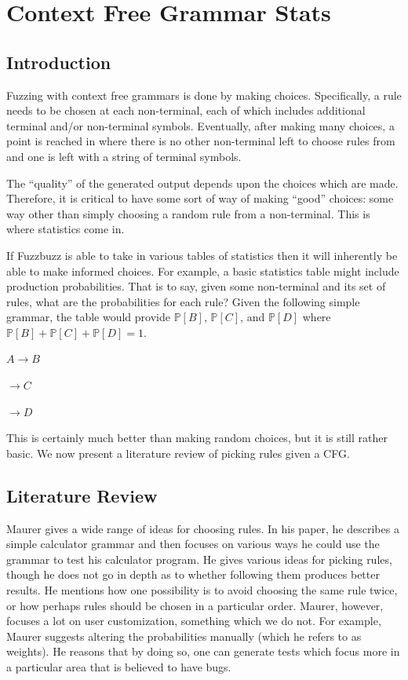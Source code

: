 \section{Context Free Grammar Stats}
\subsection{Introduction}
Fuzzing with context free grammars is done by making choices. Specifically, a
rule needs to be chosen at each non-terminal, each of which includes additional
terminal and/or non-terminal symbols. Eventually, after making many choices, a
point is reached in where there is no other non-terminal left to choose rules
from and one is left with a string of terminal symbols.

The ``quality'' of the generated output depends upon the choices
which are made. Therefore, it is critical to have some sort of way of making
``good'' choices: some way other than simply choosing a random rule from a
non-terminal. This is where statistics come in.

If Fuzzbuzz is able to take in various tables of statistics then it will
inherently be able to make informed choices. For example, a basic statistics
table might include production probabilities. That is to say, given some
non-terminal and its set of rules, what are the probabilities for each rule?
Given the following simple grammar, the table would provide $\mathbb{P}[B]$,
$\mathbb{P}[C]$, and $\mathbb{P}[D]$ where $\mathbb{P}[B] + \mathbb{P}[C] +
\mathbb{P}[D] = 1$.

\begin{center}
$A \rightarrow B$
\end{center}
\begin{center}
$\rightarrow C$
\end{center}
\begin{center}
$\rightarrow D$
\end{center}

This is certainly much better than making random choices, but it is still
rather basic. We now present a literature review of picking rules given a CFG.

\subsection{Literature Review}

Maurer\cite{Maurer1990} gives a wide range of ideas for choosing rules. In his
paper, he describes a simple calculator grammar and then focuses on various
ways he could use the grammar to test his calculator program. He gives various
ideas for picking rules, though he does not go in depth as to whether following
them produces better results. He mentions how one possibility is to avoid
choosing the same rule twice, or how perhaps rules should be chosen in a
particular order. Maurer, however, focuses a lot on user customization,
something which we do not. For example, Maurer suggests altering the
probabilities manually (which he refers to as weights). He reasons that by
doing so, one can generate tests which focus more in a particular area that is
believed to have bugs.

